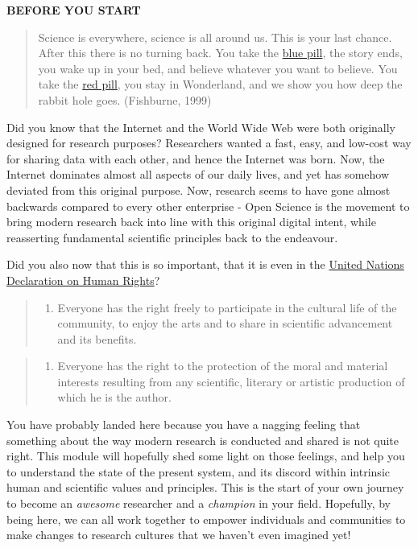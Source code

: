 \documentclass[]{book}
\providecommand{\tightlist}{%
  \setlength{\itemsep}{0pt}\setlength{\parskip}{0pt}}
\begin{document}
\textbf{BEFORE YOU START}

\begin{quote}
Science is everywhere, science is all around us. This is your last chance. After this there is no turning back. You take the \href{https://www.elsevier.com/about/open-science}{blue pill}, the story ends, you wake up in your bed, and believe whatever you want to believe. You take the \protect\hyperlink{Introduction}{red pill}, you stay in Wonderland, and we show you how deep the rabbit hole goes. (Fishburne, 1999)
\end{quote}

Did you know that the Internet and the World Wide Web were both originally designed for research purposes? Researchers wanted a fast, easy, and low-cost way for sharing data with each other, and hence the Internet was born. Now, the Internet dominates almost all aspects of our daily lives, and yet has somehow deviated from this original purpose. Now, research seems to have gone almost backwards compared to every other enterprise - Open Science is the movement to bring modern research back into line with this original digital intent, while reasserting fundamental scientific principles back to the endeavour.

Did you also now that this is so important, that it is even in the \href{http://www.un.org/en/universal-declaration-human-rights/}{United Nations Declaration on Human Rights}?

\begin{quote}
\begin{enumerate}
\def\labelenumi{(\arabic{enumi})}
\tightlist
\item
  Everyone has the right freely to participate in the cultural life of the community, to enjoy the arts and to share in scientific advancement and its benefits.
\end{enumerate}
\end{quote}

\begin{quote}
\begin{enumerate}
\def\labelenumi{(\arabic{enumi})}
\setcounter{enumi}{1}
\tightlist
\item
  Everyone has the right to the protection of the moral and material interests resulting from any scientific, literary or artistic production of which he is the author.
\end{enumerate}
\end{quote}

You have probably landed here because you have a nagging feeling that something about the way modern research is conducted and shared is not quite right. This module will hopefully shed some light on those feelings, and help you to understand the state of the present system, and its discord within intrinsic human and scientific values and principles. This is the start of your own journey to become an \emph{awesome} researcher and a \emph{champion} in your field. Hopefully, by being here, we can all work together to empower individuals and communities to make changes to research cultures that we haven't even imagined yet!
\end{document}
